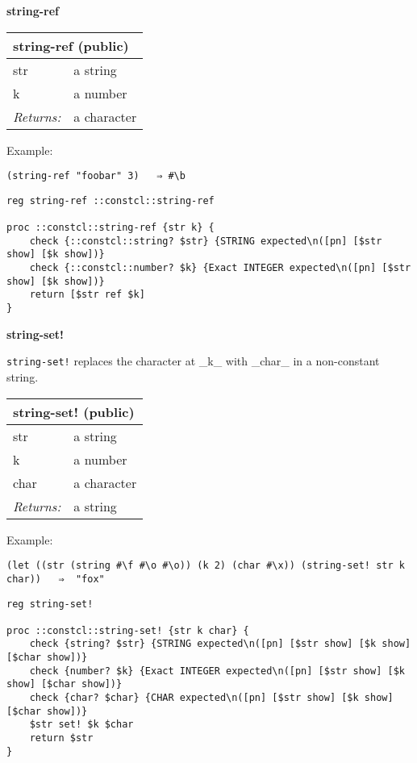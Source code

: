 \documentclass{report}
\begin{document}
\textbf{string-ref}

\begin{tabular}{ |l l| }
\hline
\multicolumn{2}{|l|}{string-ref (public)} \\
\hline
str & a string \\
k & a number \\
\textit{Returns:} & a character \\
\hline
\end{tabular}


Example:

\noindent\makebox[\linewidth]{\rule{\linewidth}{0.4pt}}
\begin{lstlisting}
(string-ref "foobar" 3)   ⇒ #\b
\end{lstlisting}
\noindent\makebox[\linewidth]{\rule{\linewidth}{0.4pt}}
\noindent\makebox[\linewidth]{\rule{\linewidth}{0.4pt}}
\begin{lstlisting}
reg string-ref ::constcl::string-ref
 
proc ::constcl::string-ref {str k} {
    check {::constcl::string? $str} {STRING expected\n([pn] [$str show] [$k show])}
    check {::constcl::number? $k} {Exact INTEGER expected\n([pn] [$str show] [$k show])}
    return [$str ref $k]
}
\end{lstlisting}
\noindent\makebox[\linewidth]{\rule{\linewidth}{0.4pt}}

\textbf{string-set!}


\texttt{string-set!} replaces the character at \_k\_ with \_char\_ in a non-constant string.

\begin{tabular}{ |l l| }
\hline
\multicolumn{2}{|l|}{string-set! (public)} \\
\hline
str & a string \\
k & a number \\
char & a character \\
\textit{Returns:} & a string \\
\hline
\end{tabular}


Example:

\noindent\makebox[\linewidth]{\rule{\linewidth}{0.4pt}}
\begin{lstlisting}
(let ((str (string #\f #\o #\o)) (k 2) (char #\x)) (string-set! str k char))   ⇒  "fox"
\end{lstlisting}
\noindent\makebox[\linewidth]{\rule{\linewidth}{0.4pt}}
\noindent\makebox[\linewidth]{\rule{\linewidth}{0.4pt}}
\begin{lstlisting}
reg string-set!
 
proc ::constcl::string-set! {str k char} {
    check {string? $str} {STRING expected\n([pn] [$str show] [$k show] [$char show])}
    check {number? $k} {Exact INTEGER expected\n([pn] [$str show] [$k show] [$char show])}
    check {char? $char} {CHAR expected\n([pn] [$str show] [$k show] [$char show])}
    $str set! $k $char
    return $str
}
\end{lstlisting}
\noindent\makebox[\linewidth]{\rule{\linewidth}{0.4pt}}
\end{document}
